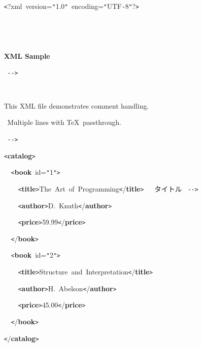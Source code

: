 \documentclass[a4paper,10pt]{article}
\def\mc{\relax}
\begin{document}
\tt\mc 

\noindent
\mbox{}{\tt <}?xml{\tt\mc \ }version={\tt "}1.0{\tt "}{\tt\mc \ }encoding={\tt "}UTF{\tt -}8{\tt "}?{\tt >}

\noindent
\mbox{}\rm\mc {\tt <}{\tt !}{\tt -}{\tt -}\  \parbox[t]{0.85\textwidth}{\ \centerline{\bf XML Sample} } \rm\mc \ {\tt -}{\tt -}{\tt >}
\tt\mc 

\noindent
\mbox{}\rm\mc {\tt <}{\tt !}{\tt -}{\tt -}\ 
\tt\mc 

\noindent
\mbox{}\rm\mc {\tt\mc \ }{\tt\mc \ }This XML file demonstrates comment handling.
\tt\mc 

\noindent
\mbox{}\rm\mc {\tt\mc \ }{\tt\mc \ }\ Multiple lines with \TeX\ passthrough. 
\tt\mc 

\noindent
\mbox{}\rm\mc \ {\tt -}{\tt -}{\tt >}
\tt\mc 

\noindent
\mbox{}{\tt <}\textbf{catalog}{\tt >}

\noindent
\mbox{}{\tt\mc \ }{\tt\mc \ }{\tt <}\textbf{book}{\tt\mc \ }id={\tt "}1{\tt "}{\tt >}

\noindent
\mbox{}{\tt\mc \ }{\tt\mc \ }{\tt\mc \ }{\tt\mc \ }{\tt <}\textbf{title}{\tt >}The{\tt\mc \ }Art{\tt\mc \ }of{\tt\mc \ }Programming{\tt <}/\textbf{title}{\tt >}{\tt\mc \ }{\tt\mc \ }\rm\mc {\tt <}{\tt !}{\tt -}{\tt -}\  タイトル \rm\mc \ {\tt -}{\tt -}{\tt >}
\tt\mc 

\noindent
\mbox{}{\tt\mc \ }{\tt\mc \ }{\tt\mc \ }{\tt\mc \ }{\tt <}\textbf{author}{\tt >}D.{\tt\mc \ }Knuth{\tt <}/\textbf{author}{\tt >}

\noindent
\mbox{}{\tt\mc \ }{\tt\mc \ }{\tt\mc \ }{\tt\mc \ }{\tt <}\textbf{price}{\tt >}59.99{\tt <}/\textbf{price}{\tt >}

\noindent
\mbox{}{\tt\mc \ }{\tt\mc \ }{\tt <}/\textbf{book}{\tt >}

\noindent
\mbox{}{\tt\mc \ }{\tt\mc \ }{\tt <}\textbf{book}{\tt\mc \ }id={\tt "}2{\tt "}{\tt >}

\noindent
\mbox{}{\tt\mc \ }{\tt\mc \ }{\tt\mc \ }{\tt\mc \ }{\tt <}\textbf{title}{\tt >}Structure{\tt\mc \ }and{\tt\mc \ }Interpretation{\tt <}/\textbf{title}{\tt >}

\noindent
\mbox{}{\tt\mc \ }{\tt\mc \ }{\tt\mc \ }{\tt\mc \ }{\tt <}\textbf{author}{\tt >}H.{\tt\mc \ }Abelson{\tt <}/\textbf{author}{\tt >}

\noindent
\mbox{}{\tt\mc \ }{\tt\mc \ }{\tt\mc \ }{\tt\mc \ }{\tt <}\textbf{price}{\tt >}45.00{\tt <}/\textbf{price}{\tt >}

\noindent
\mbox{}{\tt\mc \ }{\tt\mc \ }{\tt <}/\textbf{book}{\tt >}

\noindent
\mbox{}{\tt <}/\textbf{catalog}{\tt >}

\rm\mc
\end{document}
